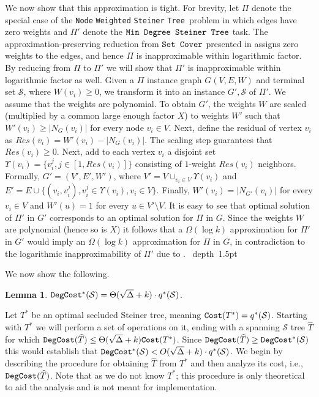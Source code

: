 \documentclass[12pt]{article}
\newtheorem{lemma}[theorem]{Lemma}
\def\Cost{\mbox{\tt Cost}}
\def\Proof{\par\noindent{\bf Proof:~}}
\def\blackslug{\hbox{\hskip 1pt \vrule width 4pt height 8pt
    depth 1.5pt \hskip 1pt}}
\def\QED{\quad\blackslug\lower 8.5pt\null\par}
\newcommand{\MAXDEG}[0]{\Delta}
\newcommand{\Terminals}[0]{\mathcal{S}}
\newcommand{\NodeSteiner}[0]{\mbox{\tt Node} \mbox{\tt Weighted}
\mbox{\tt Steiner} \mbox{\tt Tree}}
\newcommand{\PSDeg}[0]{\mbox{\tt Min Degree Steiner Tree}}
\newcommand{\SC}[0]{\mbox{\tt Set Cover}}
\def\Cost{\mbox{\tt Cost}}
\def\DegCost{\mbox{\tt DegCost}}
\def\OptDegCost{\DegCost^{*}}
\begin{document}
We now show that this approximation is tight.
For brevity, let $\Pi$ denote the special case of the \NodeSteiner\ problem in which edges have zero weights and $\Pi'$ denote the $\PSDeg$ task.
The approximation-preserving reduction from $\SC$ presented in \cite{KleinR95} assigns zero weights to the edges, and hence $\Pi$ is inapproximable within logarithmic factor.  By reducing from $\Pi$ to $\Pi'$ we will show that $\Pi'$ is inapproximable within logarithmic factor as well. Given a $\Pi$ instance graph $G(V,E,W)$ and terminal set $\Terminals$, where $W(v_i)\geq 0$, we transform it into an instance $G', \Terminals$ of $\Pi'$. We assume that the weights are polynomial. To obtain $G'$, the weights $W$ are scaled (multiplied by a common large enough factor $X$) to weights $W'$ such that $W'(v_i)\geq |N_G(v_i)|$ for every node $v_i \in V$. Next, define the residual of vertex $v_i$ as $Res(v_i)=W'(v_i)-|N_G(v_i)|$. The scaling step guarantees that $Res(v_i)\geq 0$.
Next, add to each vertex $v_i$ a disjoint set $\Upsilon(v_i)=\{ v_i^j, j \in [1, Res(v_i)]\}$ consisting of $1$-weight $Res(v_i)$ neighbors. Formally, $G'=(V',E',W')$, where $V'=V \cup_{v_i \in V} \Upsilon(v_i)$ and $E'=E \cup \{ (v_i, v_i^{j}), v_i^{j}\in \Upsilon(v_i), v_i \in V\}$. Finally,  $W'(v_i)=|N_{G'}(v_i)|$ for every $v_i \in V$ and $W'(u)=1$ for every $u \in V' \setminus V$. It is easy to see that optimal solution of $\Pi'$ in $G'$ corresponds to an optimal solution for $\Pi$ in $G$. Since the weights $W$ are polynomial (hence so is $X$) it follows that a $\Omega(\log k)$ approximation for  $\Pi'$ in $G'$ would imply an $\Omega(\log k)$ approximation for  $\Pi$ in $G$, in contradiction to the logarithmic inapproximability of $\Pi'$ due to \cite{KleinR95}.
\QED
We now show the following.
\begin{lemma}
\label{cl:degcost}
$\OptDegCost(\Terminals)=\Theta(\sqrt{\MAXDEG}+k)\cdot q^{*}(\Terminals)$.
\end{lemma}
\Proof
Let $T^{*}$ be an optimal secluded Steiner tree, meaning $\Cost(T^{*})=q^{*}(\Terminals)$. Starting with $T^{*}$ we will perform a set of operations on it, ending with a spanning $\Terminals$ tree $\widehat{T}$ for which $\DegCost(\widehat{T}) \leq \Theta(\sqrt{\MAXDEG}+k) \Cost(T^{*})$. Since $\DegCost(\widehat{T})\geq \OptDegCost(\Terminals)$ this would establish that $\OptDegCost(\Terminals)<O(\sqrt{\MAXDEG}+k)\cdot q^{*}(\Terminals)$. We begin by describing the procedure for obtaining $\widehat{T}$ from $T^{*}$ and then analyze its cost, i.e.,  $\DegCost(\widehat{T})$. Note that as we do not know $T^{*}$; this procedure is only theoretical to aid the analysis and is not meant for implementation.
\end{document}
